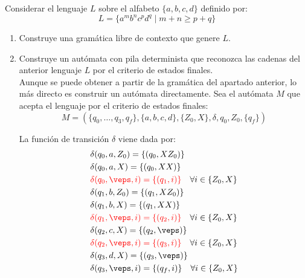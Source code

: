 \begin{ejercicio}\label{ej:1.5.26}
    Considerar el lenguaje $L$ sobre el alfabeto $\{a,b,c,d\}$ definido por:
    \begin{equation*}
        L = \{a^m b^n c^p d^q \mid m+n\geq p+q\}
    \end{equation*}
    \begin{enumerate}
        \item Construye una gramática libre de contexto que genere $L$.
        
        \item Construye un autómata con pila determinista que reconozca las cadenas del anterior lenguaje $L$ por el criterio de estados finales.\\
        
        Aunque se puede obtener a partir de la gramática del apartado anterior, lo más directo es construir un autómata directamente. Sea el autómata $M$ que acepta el lenguaje por el criterio de estados finales:
        \begin{equation*}
            M=(\{q_0,\dots,q_3,q_f\},\{a,b,c,d\},\{Z_0,X\},\delta,q_0,Z_0,\{q_f\})
        \end{equation*}

        La función de transición $\delta$ viene dada por:
        \begin{align*}
            &\delta(q_0,a,Z_0) = \{(q_0,XZ_0)\} \\
            &\delta(q_0,a,X) = \{(q_0,XX)\} \\
            &\red{\delta(q_0,\veps,i) = \{(q_1,i)\}} \quad \forall i\in \{Z_0,X\} \\
            &\delta(q_1,b,Z_0) = \{(q_1,XZ_0)\} \\
            &\delta(q_1,b,X) = \{(q_1,XX)\} \\
            &\red{\delta(q_1,\veps,i) = \{(q_2,i)\}} \quad \forall i\in \{Z_0,X\} \\
            &\delta(q_2,c,X) = \{(q_2,\veps)\} \\
            &\red{\delta(q_2,\veps,i) = \{(q_3,i)\}} \quad \forall i\in \{Z_0,X\} \\
            &\delta(q_3,d,X) = \{(q_3,\veps)\} \\
            &\delta(q_3,\veps,i) = \{(q_f,i)\} \quad \forall i\in \{Z_0,X\}
        \end{align*}
    \end{enumerate}
\end{ejercicio}

